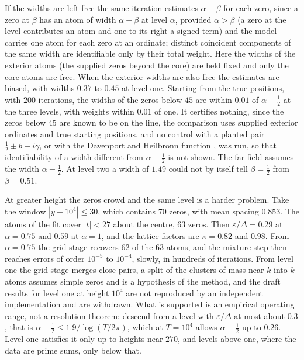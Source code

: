 If the widths are left free the same iteration estimates $\alpha-\beta$ for each zero, since a zero at $\beta$ has an atom of width $\alpha-\beta$ at level $\alpha$, provided $\alpha>\beta$ (a zero at the level contributes an atom and one to its right a signed term) and the model carries one atom for each zero at an ordinate; distinct coincident components of the same width are identifiable only by their total weight. Here the widths of the exterior atoms (the supplied zeros beyond the core) are held fixed and only the core atoms are free. When the exterior widths are also free the estimates are biased, with widths $0.37$ to $0.45$ at level one. Starting from the true positions, with $200$ iterations, the widths of the zeros below $45$ are within $0.01$ of $\alpha-\frac12$ at the three levels, with weights within $0.01$ of one. It certifies nothing, since the zeros below $45$ are known to be on the line, the comparison uses supplied exterior ordinates and true starting positions, and no control with a planted pair $\frac12\pm b+i\gamma$, or with the Davenport and Heilbronn function \cite{Davenport,Spira94}, was run, so that identifiability of a width different from $\alpha-\frac12$ is not shown. The far field assumes the width $\alpha-\frac12$. At level two a width of $1.49$ could not by itself tell $\beta=\frac12$ from $\beta=0.51$.

At greater height the zeros crowd and the same level is a harder problem. Take the window $|y-10^4|\le30$, which contains $70$ zeros, with mean spacing $0.853$. The atoms of the fit cover $|t|<27$ about the centre, $63$ zeros. Then $\varepsilon/\Delta=0.29$ at $\alpha=0.75$ and $0.59$ at $\alpha=1$, and the lattice factors are $\kappa=0.82$ and $0.98$. From $\alpha=0.75$ the grid stage recovers $62$ of the $63$ atoms, and the mixture step then reaches errors of order $10^{-5}$ to $10^{-4}$, slowly, in hundreds of iterations. From level one the grid stage merges close pairs, a split of the clusters of mass near $k$ into $k$ atoms assumes simple zeros and is a hypothesis of the method, and the draft results for level one at height $10^4$  are not reproduced by an independent implementation and are withdrawn. What is supported is an empirical operating range, not a resolution theorem: descend from a level with $\varepsilon/\Delta$ at most about $0.3$, that is $\alpha-\frac12\le1.9/\log(T/2\pi)$, which at $T=10^4$ allows $\alpha-\frac12$ up to $0.26$. Level one satisfies it only up to heights near $270$, and levels above one, where the data are prime sums, only below that.

